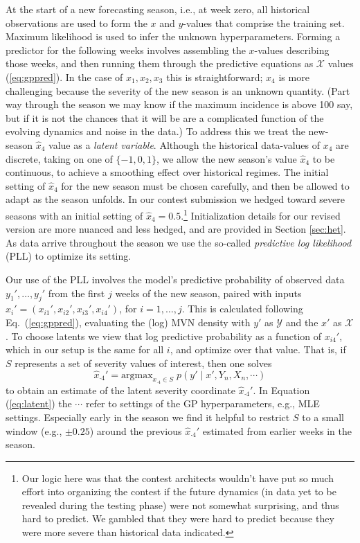 \documentclass[12pt]{article}
\begin{document}
At the start of a new forecasting season, i.e., at week zero, all historical
observations are used to form the $x$ and $y$-values that comprise the
training set. Maximum likelihood is used to infer the unknown hyperparameters.
Forming a predictor for the following weeks involves assembling the $x$-values
describing those weeks, and then running them through the predictive equations
as $\mathcal{X}$ values (\ref{eq:gppred}).  In the case of $x_1, x_2, x_3$
this is straightforward; $x_4$ is more challenging because the severity of the
new season is an unknown quantity.  (Part way through the season we may know
if the maximum incidence is above 100 say, but if it is not the chances that
it will be are a complicated function of the evolving dynamics and noise in
the data.)  To address this we treat the new-season $\hat{x}_4$ value as a
{\em latent variable}.  Although the historical data-values of $x_4$ are
discrete, taking on one of $\{-1,0,1\}$, we allow the new season's value
$\hat{x}_4$ to be continuous, to achieve a smoothing effect over historical
regimes.  The initial setting of $\hat{x}_4$ for the new season must be chosen
carefully, and then be allowed to adapt as the season unfolds.  In our contest
submission we hedged toward severe seasons with an initial setting of
$\hat{x}_4=0.5$.\footnote{Our logic here was that the contest architects
wouldn't have put so much effort into organizing the contest if the future
dynamics (in data yet to be revealed during the testing phase) were not
somewhat surprising, and thus hard to predict.  We gambled that they were hard
to predict because they were more severe than historical data indicated.} Initialization details for our revised version are more nuanced and less
hedged, and are provided in Section \ref{sec:het}.  As data arrive throughout
the season we use the so-called {\em predictive log likelihood} (PLL) to
optimize its setting.

Our use of the PLL involves the model's predictive probability of
observed data $y_1', \dots, y_j'$ from the first $j$ weeks of the new season,
paired with inputs $x_i'=(x_{i1}', x_{i2}', x_{i3}', x_{i4}')$, for $i=1,
\dots, j$.  This is calculated following Eq.~(\ref{eq:gppred}), evaluating the
(log) MVN density with $y'$ as $\mathcal{Y}$ and the $x'$ as $\mathcal{X}$. To
choose latents we view that log predictive probability as a function of
$x_{i4}'$, which in our setup is the same for all $i$, and optimize over that
value. That is, if $S$ represents a set of severity values of interest, then one solves
\begin{equation}
\hat{x}_{\cdot 4}' = \mathrm{argmax}_{x_{\cdot 4} \in S} \; p(y' \mid x', Y_n, X_n, \cdots)
\label{eq:latent}
\end{equation}
to obtain an estimate of the latent severity coordinate $\hat{x}_{\cdot 4}'$.
In Equation (\ref{eq:latent}) the $\cdots$ refer to settings of the GP hyperparameters, e.g., MLE
settings.  Especially early in the season we find it helpful to restrict $S$
to a small window (e.g., $\pm 0.25$) around the previous
$\hat{x}_{\cdot 4}'$ estimated from earlier weeks in the season.
\end{document}
